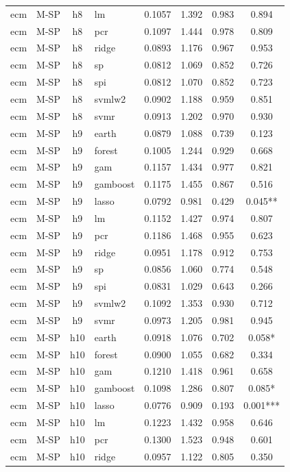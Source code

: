 \begin{ThreePartTable}
\begin{longtable}[t]{llclcccc}
ecm & M-SP & h8 & lm & 0.1057 & 1.392 & 0.983 & 0.894\\
ecm & M-SP & h8 & pcr & 0.1097 & 1.444 & 0.978 & 0.809\\
ecm & M-SP & h8 & ridge & 0.0893 & 1.176 & 0.967 & 0.953\\
ecm & M-SP & h8 & sp & 0.0812 & 1.069 & 0.852 & 0.726\\
ecm & M-SP & h8 & spi & 0.0812 & 1.070 & 0.852 & 0.723\\
ecm & M-SP & h8 & svmlw2 & 0.0902 & 1.188 & 0.959 & 0.851\\
ecm & M-SP & h8 & svmr & 0.0913 & 1.202 & 0.970 & 0.930\\
\addlinespace
ecm & M-SP & h9 & earth & 0.0879 & 1.088 & 0.739 & 0.123\\
ecm & M-SP & h9 & forest & 0.1005 & 1.244 & 0.929 & 0.668\\
ecm & M-SP & h9 & gam & 0.1157 & 1.434 & 0.977 & 0.821\\
ecm & M-SP & h9 & gamboost & 0.1175 & 1.455 & 0.867 & 0.516\\
ecm & M-SP & h9 & lasso & 0.0792 & 0.981 & 0.429 & 0.045**\\
ecm & M-SP & h9 & lm & 0.1152 & 1.427 & 0.974 & 0.807\\
ecm & M-SP & h9 & pcr & 0.1186 & 1.468 & 0.955 & 0.623\\
ecm & M-SP & h9 & ridge & 0.0951 & 1.178 & 0.912 & 0.753\\
ecm & M-SP & h9 & sp & 0.0856 & 1.060 & 0.774 & 0.548\\
ecm & M-SP & h9 & spi & 0.0831 & 1.029 & 0.643 & 0.266\\
ecm & M-SP & h9 & svmlw2 & 0.1092 & 1.353 & 0.930 & 0.712\\
ecm & M-SP & h9 & svmr & 0.0973 & 1.205 & 0.981 & 0.945\\
\addlinespace
ecm & M-SP & h10 & earth & 0.0918 & 1.076 & 0.702 & 0.058*\\
ecm & M-SP & h10 & forest & 0.0900 & 1.055 & 0.682 & 0.334\\
ecm & M-SP & h10 & gam & 0.1210 & 1.418 & 0.961 & 0.658\\
ecm & M-SP & h10 & gamboost & 0.1098 & 1.286 & 0.807 & 0.085*\\
ecm & M-SP & h10 & lasso & 0.0776 & 0.909 & 0.193 & 0.001***\\
ecm & M-SP & h10 & lm & 0.1223 & 1.432 & 0.958 & 0.646\\
ecm & M-SP & h10 & pcr & 0.1300 & 1.523 & 0.948 & 0.601\\
ecm & M-SP & h10 & ridge & 0.0957 & 1.122 & 0.805 & 0.350\\

\end{longtable}
\end{ThreePartTable}
